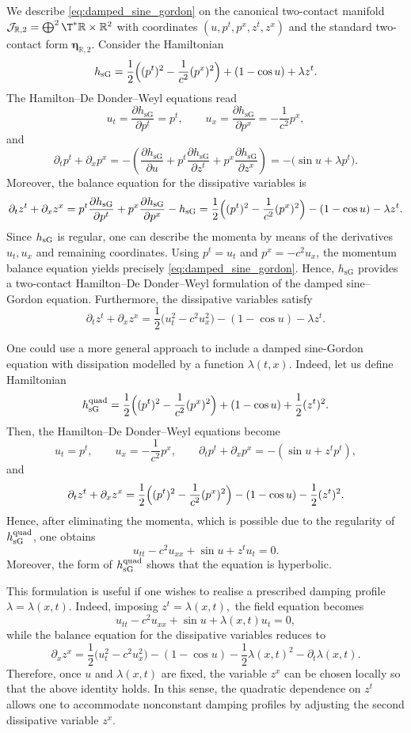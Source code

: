 \documentclass[11pt,a4paper]{article}
\theoremstyle{plain} \newtheorem{theorem}{Theorem}[section] \newtheorem{proposition}[theorem]{Proposition} \newtheorem{corollary}[theorem]{Corollary} \newtheorem{lemma}[theorem]{Lemma} \theoremstyle{definition} \newtheorem{definition}[theorem]{Definition} \theoremstyle{remark} \newtheorem{remark}[theorem]{Remark} \newtheorem{example}[theorem]{Example} %
\begin{document}
We describe \eqref{eq:damped_sine_gordon} on the canonical two-contact manifold \(\mathcal J_{\mathbb R,2}=\bigoplus^2\T^*\mathbb  R\times\mathbb R^2\) with coordinates \((u,p^t,p^x,z^t,z^x)\) and the standard two-contact form $\bm\eta_{\mathbb{R},2}$. Consider the Hamiltonian
\[
h_{\mathrm{sG}}=\frac12\Bigl((p^t)^2-\frac{1}{c^2}(p^x)^2\Bigr)+(1-\cos u)+\lambda z^t.
\]
The Hamilton--De Donder--Weyl equations read
\[
u_t=\frac{\partial h_{\mathrm{sG}}}{\partial p^t}=p^t,\qquad
u_x=\frac{\partial h_{\mathrm{sG}}}{\partial p^x}=-\frac{1}{c^2}p^x,
\]
and
\[
\partial_t p^t+\partial_x p^x
=
-\left(
\frac{\partial h_{\mathrm{sG}}}{\partial u}
+p^t\frac{\partial h_{\mathrm{sG}}}{\partial z^t}
+p^x\frac{\partial h_{\mathrm{sG}}}{\partial z^x}
\right)
=
-\bigl(\sin u+\lambda p^t\bigr).
\]
Moreover, the balance equation for the dissipative variables is
\[
\partial_t z^t+\partial_x z^x
=
p^t\frac{\partial h_{\mathrm{sG}}}{\partial p^t}
+p^x\frac{\partial h_{\mathrm{sG}}}{\partial p^x}
-h_{\mathrm{sG}}
=
\frac12\Bigl((p^t)^2-\frac{1}{c^2}(p^x)^2\Bigr)-(1-\cos u)-\lambda z^t.
\]
Since $h_{\rm sG}$ is regular, one can describe the momenta by means of the derivatives $u_t,u_x$ and remaining coordinates.  Using \(p^t=u_t\) and \(p^x=-c^2u_x\), the momentum balance equation yields precisely \eqref{eq:damped_sine_gordon}. Hence, \(h_{\mathrm{sG}}\) provides a two-contact Hamilton--De Donder--Weyl formulation of the damped sine--Gordon equation. Furthermore, the dissipative variables satisfy
\[
\partial_t z^t+\partial_x z^x
=
\frac12\bigl(u_t^2-c^2u_x^2\bigr)-(1-\cos u)-\lambda z^t.
\]

One could use a more general approach to include a damped sine-Gordon equation with dissipation modelled by a function $\lambda(t,x)$. Indeed, let us define Hamiltonian
\[
h_{\mathrm{sG}}^{\mathrm{quad}}
=
\frac12\Bigl((p^t)^2-\frac{1}{c^2}(p^x)^2\Bigr)+(1-\cos u)+\frac12 (z^t)^2.
\]
Then, the Hamilton--De Donder--Weyl equations become
\[
u_t=p^t,\qquad u_x=-\frac{1}{c^2}p^x,
\qquad 
\partial_t p^t+\partial_x p^x=-(\sin u+z^t p^t),
\]
and
\[
\partial_t z^t+\partial_x z^x
=
\frac12\Bigl((p^t)^2-\frac{1}{c^2}(p^x)^2\Bigr)-(1-\cos u)-\frac12(z^t)^2.
\]
Hence, after eliminating the momenta, which is possible due to the regularity of $h^{\rm quad}_{\rm sG}$, one obtains
\[
u_{tt}-c^2u_{xx}+\sin u+z^t u_t=0.
\]
Moreover, the form of $h^{\rm quad}_{\rm sG}$ shows that the equation is hyperbolic. 

This formulation is useful if one wishes to realise a prescribed damping profile \(\lambda=\lambda(x,t)\). Indeed, imposing
\(
z^t=\lambda(x,t),
\)
the field equation becomes
\[
u_{tt}-c^2u_{xx}+\sin u+\lambda(x,t)u_t=0,
\]
while the balance equation for the dissipative variables reduces to
\[
\partial_x z^x
=
\frac12\bigl(u_t^2-c^2u_x^2\bigr)-(1-\cos u)-\frac12\lambda(x,t)^2-\partial_t\lambda(x,t).
\]
Therefore, once \(u\) and \(\lambda(x,t)\) are fixed, the variable \(z^x\) can be chosen locally so that the above identity holds. In this sense, the quadratic dependence on \(z^t\) allows one to accommodate nonconstant damping profiles by adjusting the second dissipative variable \(z^x\).
 
\end{document}

